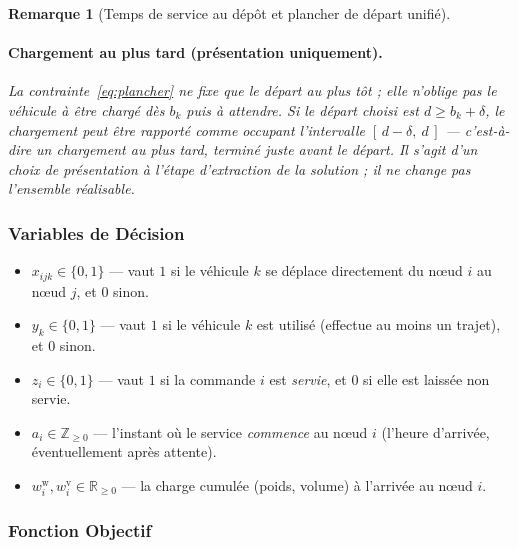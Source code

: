 \documentclass[12pt,a4paper]{report}
\newcommand{\R}{\mathbb{R}}
\newcommand{\Zp}{\mathbb{Z}_{\geq 0}}
\newtheorem{remarque}{Remarque}
\begin{document}
\begin{remarque}[Temps de service au dépôt et plancher de départ unifié]
\paragraph{Chargement au plus tard (présentation uniquement).}
La contrainte~\eqref{eq:plancher} ne fixe que le départ \emph{au plus tôt} ;
elle n'oblige pas le véhicule à être chargé dès $b_k$ puis à attendre. Si le
départ choisi est $d \geq b_k + \delta$, le chargement peut être rapporté
comme occupant l'intervalle $[\,d - \delta,\ d\,]$ --- c'est-à-dire un
chargement au plus tard, terminé juste avant le départ. Il s'agit d'un choix
de présentation à l'étape d'extraction de la solution ; il ne change pas
l'ensemble réalisable.
\end{remarque}


\subsubsection{Variables de Décision}


\begin{itemize}[leftmargin=2.2em]
  \item $x_{ijk} \in \{0,1\}$ --- vaut $1$ si le véhicule $k$ se déplace
        directement du nœud $i$ au nœud $j$, et $0$ sinon.
  \item $y_k \in \{0,1\}$ --- vaut $1$ si le véhicule $k$ est utilisé
        (effectue au moins un trajet), et $0$ sinon.
  \item $z_i \in \{0,1\}$ --- vaut $1$ si la commande $i$ est \emph{servie},
        et $0$ si elle est laissée non servie.
  \item $a_i \in \Zp$ --- l'instant où le service \emph{commence} au nœud
        $i$ (l'heure d'arrivée, éventuellement après attente).
  \item $w_i^{\mathrm w}, w_i^{\mathrm v} \in \R_{\geq 0}$ --- la charge
        cumulée (poids, volume) à l'arrivée au nœud $i$.
\end{itemize}

\subsubsection{Fonction Objectif}
\end{document}
